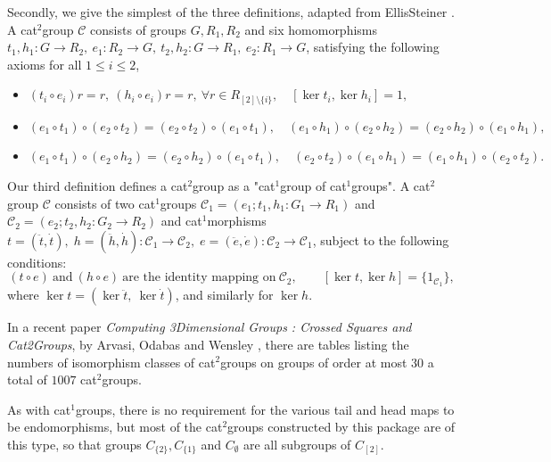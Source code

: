 \documentclass[a4paper,11pt]{report}
\newcommand{\calC}{\mathcal{C}}
\begin{document}
{{ Secondly, we give the simplest of the three definitions, adapted from
Ellis\texttt{}Steiner \cite{ell:st}. A cat$^2$\texttt{}group $\calC$ consists of groups $G, R_1,R_2$ and six homomorphisms $t_1,h_1 : G \to R_2,~ e_1 : R_2 \to G,~ t_2,h_2 : G \to R_1,~ e_2 : R_1 \to G$, satisfying the following axioms for all $1 \leqslant i \leqslant 2$, 
\begin{itemize}
\item  $ (t_i \circ e_i)r = r,~ (h_i \circ e_i)r = r,~ \forall r \in R_{[2] \setminus
\{i\}}, \quad [\ker t_i, \ker h_i] = 1, $ 
\item  $ (e_1 \circ t_1) \circ (e_2 \circ t_2) = (e_2 \circ t_2) \circ (e_1 \circ t_1),
\quad (e_1 \circ h_1) \circ (e_2 \circ h_2) = (e_2 \circ h_2) \circ (e_1 \circ
h_1), $ 
\item  $ (e_1 \circ t_1) \circ (e_2 \circ h_2) = (e_2 \circ h_2) \circ (e_1 \circ t_1),
\quad (e_2 \circ t_2) \circ (e_1 \circ h_1) = (e_1 \circ h_1) \circ (e_2 \circ
t_2). $ 
\end{itemize}
 

 Our third definition defines a cat$^2$\texttt{}group as a "cat$^1$\texttt{}group of cat$^1$\texttt{}groups". A cat$^2$\texttt{}group $\calC$ consists of two cat$^1$\texttt{}groups $\calC_1 = (e_1;t_1,h_1 : G_1 \to R_1)$ and $\calC_2 = (e_2;t_2,h_2 : G_2 \to R_2)$ and cat$^1$\texttt{}morphisms $t = (\ddot{t},\dot{t}),\; h = (\ddot{h},\dot{h}) : \calC_1 \to \calC_2,\; e =
(\ddot{e},\dot{e}) : \calC_2 \to \calC_1$, subject to the following conditions: 
\[ (t \circ e) ~\mbox{and}~ (h \circ e) ~\mbox{are the identity mapping on}~
\calC_2, \qquad [\ker t, \ker h] = \{ 1_{\calC_1} \}, \]
 where $\ker t = (\ker \ddot{t},\ \ker \dot{t})$, and similarly for $\ker h$. 

 In a recent paper \emph{Computing 3\texttt{}Dimensional Groups : Crossed Squares and
Cat2\texttt{}Groups}, by Arvasi, Odabas and Wensley \cite{AOW}, there are tables listing the numbers of isomorphism classes of cat$^2$\texttt{}groups on groups of order at most $30$ {\textendash} a total of $1007$ cat$^2$\texttt{}groups. 

 As with cat$^1$\texttt{}groups, there is no requirement for the various tail and
head maps to be endomorphisms, but most of the cat$^2$\texttt{}groups constructed by this package are of this type, so
that groups $C_{\{2\}},C_{\{1\}}$ and $C_{\emptyset}$ are all subgroups of $C_{[2]}$. 

}}
\end{document}
